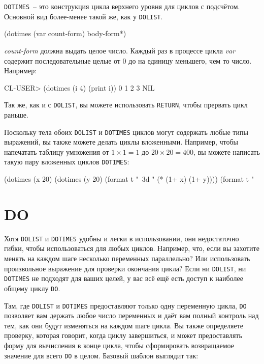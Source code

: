 \lstinline{DOTIMES}~-- это конструкция цикла верхнего уровня для циклов с подсчётом. Основной
вид более-менее такой же, как у \lstinline{DOLIST}.

\begin{myverb}
(dotimes (var count-form)
  body-form*)
\end{myverb}

\noindent{}\textit{count-form} должна выдать целое число. Каждый раз в процессе цикла \textit{var}
содержит последовательные целые от 0 до на единицу меньшего, чем то число.  Например:

\begin{myverb}
CL-USER> (dotimes (i 4) (print i))
0
1
2
3
NIL
\end{myverb}

Так же, как и с \lstinline{DOLIST}, вы можете использовать \lstinline{RETURN}, чтобы прервать цикл
раньше.

Поскольку тела обоих \lstinline{DOLIST} и \lstinline{DOTIMES} циклов могут содержать любые типы
выражений, вы также можете делать циклы вложенными. Например, чтобы напечатать таблицу
умножения от $1 \times 1 = 1$ до $20 \times 20 = 400$, вы можете написать такую пару вложенных циклов
\lstinline{DOTIMES}:

\begin{myverb}
(dotimes (x 20)
  (dotimes (y 20)
    (format t "~3d " (* (1+ x) (1+ y))))
  (format t "~%
\end{myverb}

\section{DO}

Хотя \lstinline{DOLIST} и \lstinline{DOTIMES} удобны и легки в использовании, они недостаточно
гибки, чтобы использоваться для любых циклов. Например, что, если вы захотите менять на
каждом шаге несколько переменных параллельно? Или использовать произвольное выражение для
проверки окончания цикла? Если ни \lstinline{DOLIST}, ни \lstinline{DOTIMES} не подходят для ваших
целей, у вас всё ещё есть доступ к наиболее общему циклу \lstinline{DO}.

Там, где \lstinline{DOLIST} и \lstinline{DOTIMES} предоставляют только одну переменную цикла,
\lstinline{DO} позволяет вам держать любое число переменных и даёт вам полный контроль над тем,
как они будут изменяться на каждом шаге цикла. Вы также определяете проверку, которая
говорит, когда циклу завершиться, и может предоставлять форму для вычисления в конце цикла,
чтобы сформировать возвращаемое значение для всего \lstinline{DO} в целом. Базовый шаблон
выглядит так:

